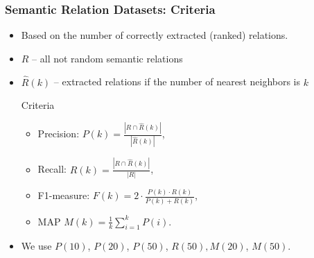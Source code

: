\documentclass{beamer}
\begin{document}
\begin{frame}
\frametitle{Semantic Relation Datasets: Criteria}

\begin{itemize}
  
  \item Based on the number of correctly extracted (ranked) relations.
  

\item $R$ -- all not random semantic relations 

\item $\hat{R}(k)$ --  extracted relations if the number of nearest neighbors is $k$

\begin{block}{Criteria}

	
	\begin{itemize}
		\item Precision: $P(k)=$$\frac{|R \cap \hat{R}(k)|}{|\hat{R}(k)|}$,
		\item Recall: $R(k)=$$\frac{|R \cap \hat{R}(k)|}{|R|}$,
		\item F1-measure: $F(k)= 2 \cdot \frac{P(k) \cdot R(k)}{P(k) + R(k)}$,
		\item MAP $M(k) = \frac{1}{k}\sum^{k}_{i=1}P(i)$.
	\end{itemize}	
	\end{block}

\item We use $P(10)$, $P(20)$, $P(50)$, $R(50),M(20)$, $M(50)$.
	

\end{itemize}
	
	
\end{frame}
\end{document}
